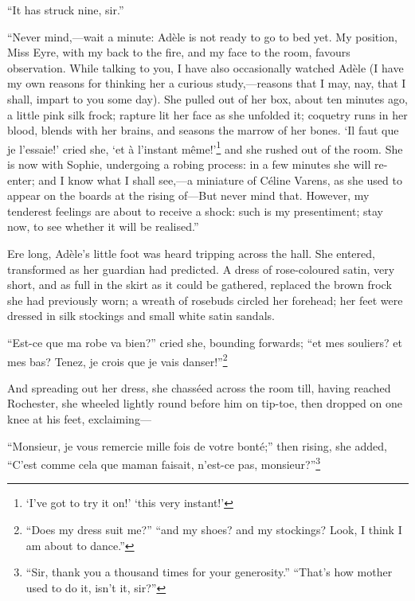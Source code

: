 \enquote{It has struck nine, sir.}

\enquote{Never mind,---wait a minute: Adèle is not ready to go to bed
	yet. My position, Miss Eyre, with my back to the fire, and my face to
	the room, favours observation. While talking to you, I have also
	occasionally watched Adèle (I have my own reasons for thinking her a
	curious study,---reasons that I may, nay, that I shall, impart to you
	some day). She pulled out of her box, about ten minutes ago, a little
	pink silk frock; rapture lit her face as she unfolded it; coquetry runs
	in her blood, blends with her brains, and seasons the marrow of her
	bones. \foreignquote{french}{Il faut que je l'essaie!} cried she, \foreignquote{french}{et à
		l'instant même!}\footnote{\enquote{I've got to try it on!} \textelp{} \enquote{this very instant!}}
	and she rushed out of the room. She is now with
	Sophie, undergoing a robing process: in a few minutes she will re-enter;
	and I know what I shall see,---a miniature of Céline Varens, as she used
	to appear on the boards at the rising of---But never mind that.
	However, my tenderest feelings are about to receive a shock: such is my
	presentiment; stay now, to see whether it will be realised.}

Ere long, Adèle's little foot was heard tripping across the hall. She
entered, transformed as her guardian had predicted. A dress of
rose-coloured satin, very short, and as full in the skirt as it could be
gathered, replaced the brown frock she had previously worn; a wreath of
rosebuds circled her forehead; her feet were dressed in silk stockings
and small white satin sandals.

\foreignquote{french}{Est-ce que ma robe va bien?} cried she, bounding forwards;
\foreignquote{french}{et mes souliers? et mes bas? Tenez, je crois que je vais
	danser!}\footnote{\enquote{Does my dress suit me?} \textelp{} \enquote{and my shoes?
		and my stockings? Look, I think I am about to dance.}}

And spreading out her dress, she chasséed across the room till, having
reached \Mr{} Rochester, she wheeled lightly round before him on tip-toe,
then dropped on one knee at his feet, exclaiming---

\foreignquote{french}{Monsieur, je vous remercie mille fois de votre bonté;} then
rising, she added, \foreignquote{french}{C'est comme cela que maman faisait, n'est-ce
	pas, monsieur?}\footnote{\enquote{Sir, thank you a thousand times for your generosity.}
	\textelp{} \enquote{That's how mother used to do it, isn't it, sir?}}

